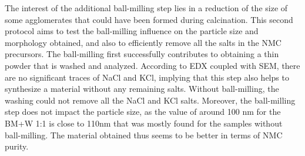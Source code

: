 \documentclass{article}
\begin{document}
\begin{itemize}
  The interest of the additional ball-milling step lies in a
   reduction of the size of some agglomerates that could have been 
  formed during calcination. This second protocol aims to test the ball-milling 
  influence on the particle size and morphology obtained, and also to efficiently 
  remove all the salts in the NMC precursors. The ball-milling first successfully 
  contributes to obtaining a thin powder that is washed and analyzed. According to
   EDX coupled with SEM, there are no significant traces of NaCl and KCl, implying 
  that this step also helps to synthesize a material without any remaining salts. 
  Without ball-milling, the washing could not remove all the NaCl and KCl salts. 
  Moreover, the ball-milling step does not impact the particle size, as the value
   of around 100 nm for the BM+W 1:1 is close to 110nm that was mostly found for 
  the samples without ball-milling. The material obtained thus seems to be better in terms of NMC purity.\\
  \end{itemize}
\end{document}
